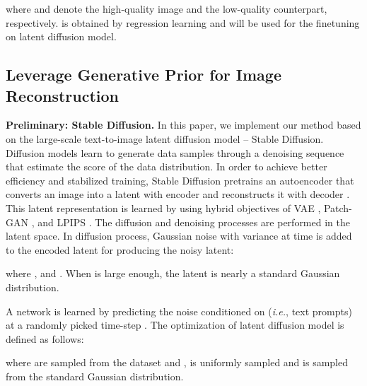 \documentclass{article}
\begin{document}
where  and  denote the high-quality image and the low-quality counterpart, respectively.  is obtained by regression learning and will be used for the finetuning on latent diffusion model.

\subsection{Leverage Generative Prior for Image Reconstruction}
\label{sec:method2}
\noindent\textbf{Preliminary: Stable Diffusion.}
In this paper, we implement our method based on the large-scale text-to-image latent diffusion model -- Stable Diffusion.
Diffusion models learn to generate data samples
through a denoising sequence that estimate
the score of the data distribution. 
In order to achieve better efficiency and stabilized training, Stable Diffusion pretrains an autoencoder \cite{kingma2013auto} that converts an image  into a latent  with encoder  and reconstructs it with decoder . 
This latent representation is learned by using hybrid objectives of VAE \cite{vae}, Patch-GAN \cite{pix2pix}, and LPIPS \cite{lpips}.
The diffusion and denoising processes are performed in the latent space.
In diffusion process, Gaussian noise with variance  at time  is added to the encoded latent  for producing the noisy latent:

where , 
 and . When  is large enough, the latent  is nearly a
standard Gaussian distribution.

A network  is learned by predicting the noise  conditioned on  (\textit{i.e.}, text prompts) at a randomly picked time-step . The optimization of latent diffusion model is defined as follows:

where  are sampled from the dataset and ,  is uniformly sampled and  is sampled from the standard Gaussian distribution.
\end{document}
